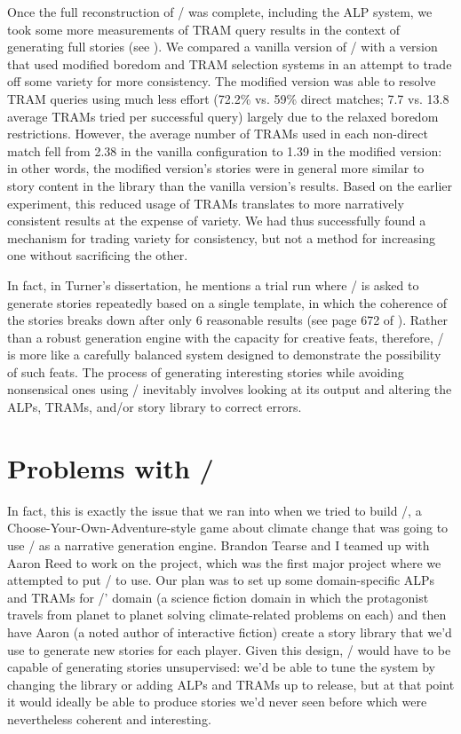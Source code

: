 Once the full reconstruction of \minstrel/ was complete, including the ALP system, we took some more measurements of TRAM query results in the context of generating full stories (see \citep{Tearse2012}).
%
We compared a vanilla version of \skald/ with a version that used modified boredom and TRAM selection systems in an attempt to trade off some variety for more consistency.
%
The modified version was able to resolve TRAM queries using much less effort (72.2\% vs. 59\% direct matches; 7.7 vs. 13.8 average TRAMs tried per successful query) largely due to the relaxed boredom restrictions.
%
However, the average number of TRAMs used in each non-direct match fell from 2.38 in the vanilla configuration to 1.39 in the modified version: in other words, the modified version's stories were in general more similar to story content in the library than the vanilla version's results.
%
Based on the earlier experiment, this reduced usage of TRAMs translates to more narratively consistent results at the expense of variety. 
%
We had thus successfully found a mechanism for trading variety for consistency, but not a method for increasing one without sacrificing the other.


In fact, in Turner's dissertation, he mentions a trial run where \minstrel/ is asked to generate stories repeatedly based on a single template, in which the coherence of the stories breaks down after only 6 reasonable results (see page 672 of \citep{Turner1993}).
%
Rather than a robust generation engine with the capacity for creative feats, therefore, \minstrel/ is more like a carefully balanced system designed to demonstrate the possibility of such feats.
%
The process of generating interesting stories while avoiding nonsensical ones using \minstrel/ inevitably involves looking at its output and altering the ALPs, TRAMs, and/or story library to correct errors.


\section{Problems with \problemplanets/}

\label{sec:problem-planets-problems}

In fact, this is exactly the issue that we ran into when we tried to build \problemplanets/, a Choose-Your-Own-Adventure-style game about climate change that was going to use \skald/ as a narrative generation engine.
%
Brandon Tearse and I teamed up with Aaron Reed to work on the project, which was the first major project where we attempted to put \skald/ to use.
%
Our plan was to set up some domain-specific ALPs and TRAMs for \problemplanets/' domain (a science fiction domain in which the protagonist travels from planet to planet solving climate-related problems on each) and then have Aaron (a noted author of interactive fiction) create a story library that we'd use to generate new stories for each player.
%
Given this design, \skald/ would have to be capable of generating stories unsupervised: we'd be able to tune the system by changing the library or adding ALPs and TRAMs up to release, but at that point it would ideally be able to produce stories we'd never seen before which were nevertheless coherent and interesting.


